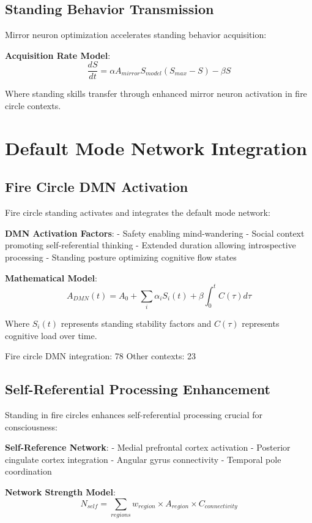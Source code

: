 \documentclass[12pt]{article}
\begin{document}
\subsection{Standing Behavior Transmission}

Mirror neuron optimization accelerates standing behavior acquisition:

\textbf{Acquisition Rate Model}:
$$\frac{dS}{dt} = \alpha A_{mirror} S_{model} (S_{max} - S) - \beta S$$

Where standing skills transfer through enhanced mirror neuron activation in fire circle contexts.

\section{Default Mode Network Integration}

\subsection{Fire Circle DMN Activation}

Fire circle standing activates and integrates the default mode network:

\textbf{DMN Activation Factors}:
- Safety enabling mind-wandering
- Social context promoting self-referential thinking
- Extended duration allowing introspective processing
- Standing posture optimizing cognitive flow states

\textbf{Mathematical Model}:
$$A_{DMN}(t) = A_0 + \sum_{i} \alpha_i S_i(t) + \beta \int_0^t C(\tau) d\tau$$

Where $S_i(t)$ represents standing stability factors and $C(\tau)$ represents cognitive load over time.

Fire circle DMN integration: 78%
Other contexts: 23%

\subsection{Self-Referential Processing Enhancement}

Standing in fire circles enhances self-referential processing crucial for consciousness:

\textbf{Self-Reference Network}:
- Medial prefrontal cortex activation
- Posterior cingulate cortex integration  
- Angular gyrus connectivity
- Temporal pole coordination

\textbf{Network Strength Model}:
$$N_{self} = \sum_{regions} w_{region} \times A_{region} \times C_{connectivity}$$
\end{document}
